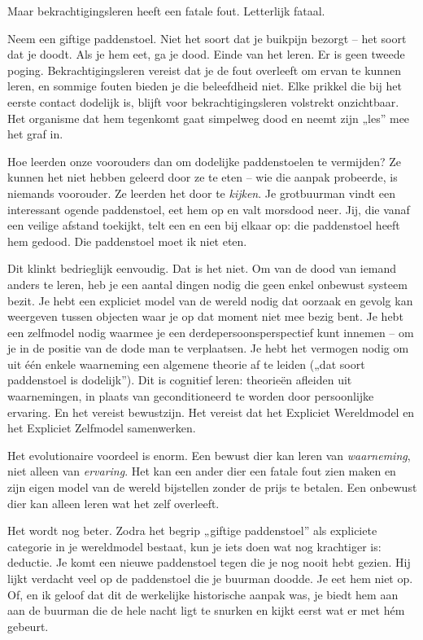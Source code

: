 \documentclass[11pt, twoside, openright]{book}
\begin{document}
Maar bekrachtigingsleren heeft een fatale fout. Letterlijk fataal.

Neem een giftige paddenstoel. Niet het soort dat je buikpijn bezorgt -- het soort dat je doodt. Als je hem eet, ga je dood. Einde van het leren. Er is geen tweede poging. Bekrachtigingsleren vereist dat je de fout overleeft om ervan te kunnen leren, en sommige fouten bieden je die beleefdheid niet. Elke prikkel die bij het eerste contact dodelijk is, blijft voor bekrachtigingsleren volstrekt onzichtbaar. Het organisme dat hem tegenkomt gaat simpelweg dood en neemt zijn „les” mee het graf in.

Hoe leerden onze voorouders dan om dodelijke paddenstoelen te vermijden? Ze kunnen het niet hebben geleerd door ze te eten -- wie die aanpak probeerde, is niemands voorouder. Ze leerden het door te \textit{kijken}. Je grotbuurman vindt een interessant ogende paddenstoel, eet hem op en valt morsdood neer. Jij, die vanaf een veilige afstand toekijkt, telt een en een bij elkaar op: die paddenstoel heeft hem gedood. Die paddenstoel moet ik niet eten.

Dit klinkt bedrieglijk eenvoudig. Dat is het niet. Om van de dood van iemand anders te leren, heb je een aantal dingen nodig die geen enkel onbewust systeem bezit. Je hebt een expliciet model van de wereld nodig dat oorzaak en gevolg kan weergeven tussen objecten waar je op dat moment niet mee bezig bent. Je hebt een zelfmodel nodig waarmee je een derdepersoonsperspectief kunt innemen -- om je in de positie van de dode man te verplaatsen. Je hebt het vermogen nodig om uit één enkele waarneming een algemene theorie af te leiden („dat soort paddenstoel is dodelijk”). Dit is cognitief leren: theorieën afleiden uit waarnemingen, in plaats van geconditioneerd te worden door persoonlijke ervaring. En het vereist bewustzijn. Het vereist dat het Expliciet Wereldmodel en het Expliciet Zelfmodel samenwerken.

Het evolutionaire voordeel is enorm. Een bewust dier kan leren van \textit{waarneming}, niet alleen van \textit{ervaring}. Het kan een ander dier een fatale fout zien maken en zijn eigen model van de wereld bijstellen zonder de prijs te betalen. Een onbewust dier kan alleen leren wat het zelf overleeft.

Het wordt nog beter. Zodra het begrip „giftige paddenstoel” als expliciete categorie in je wereldmodel bestaat, kun je iets doen wat nog krachtiger is: deductie. Je komt een nieuwe paddenstoel tegen die je nog nooit hebt gezien. Hij lijkt verdacht veel op de paddenstoel die je buurman doodde. Je eet hem niet op. Of, en ik geloof dat dit de werkelijke historische aanpak was, je biedt hem aan aan de buurman die de hele nacht ligt te snurken en kijkt eerst wat er met hém gebeurt.
\end{document}

